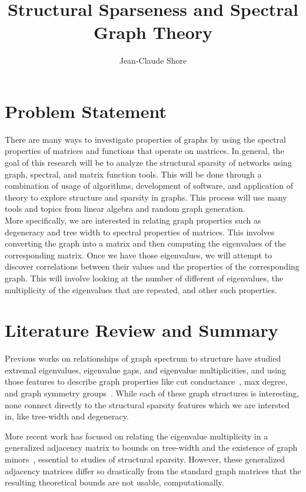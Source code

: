 \documentclass[a4paper,10pt]{article}
\title{Structural Sparseness and Spectral Graph Theory}
\author{Jean-Claude Shore}
\begin{document}
	\maketitle
	\section{Problem Statement}

	There are many ways to investigate properties of graphs by using the spectral properties of matrices and functions that operate on matrices.  In general, the goal of this research will be to analyze the structural sparsity of networks using graph, spectral, and matrix function tools.  This will be done through a combination of usage of algorithms, development of software, and application of theory to explore structure and sparsity in graphs.  This process will use many tools and topics from linear algebra and random graph generation.\\

	More specifically, we are interested in relating graph properties such as degeneracy and tree width to spectral properties of matrices.  This involves converting the graph into a matrix and then computing the eigenvalues of the corresponding matrix.  Once we have those eigenvalues, we will attempt to discover correlations between their values and the properties of the corresponding graph.  This will involve looking at the number of different of eigenvalues, the multiplicity of the eigenvalues that are repeated, and other such properties.


\section{Literature Review and Summary}

Previous works on relationships of graph spectrum to structure have studied extremal eigenvalues, eigenvalue gaps, and eigenvalue multiplicities, and using those features to describe graph properties like cut conductance~\cite{fiedler1973algebraic,mihail1989conductance}, max degree, and graph symmetry groups~\cite{VANDAM1995139}. While each of these graph structures is interesting, none connect directly to the structural sparsity features which we are intersted in, like tree-width and degeneracy.

More recent work has focused on relating the eigenvalue multiplicity in a generalized adjacency matrix to bounds on tree-width and the existence of graph minors~\cite{de1998multiplicities,hogben2005spectral,Hong2004281}, essential to studies of structural sparsity. However, these generalized adjacency matrices differ so drastically from the standard graph matrices that the resulting theoretical bounds are not usable, computationally.
\end{document}
